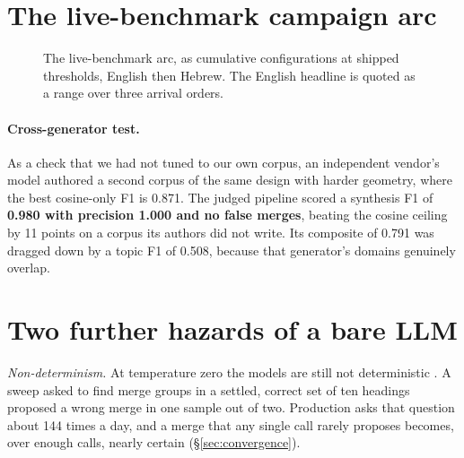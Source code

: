 \documentclass{article}
\newcommand{\hl}[1]{\textbf{#1}}
\begin{document}
\section{The live-benchmark campaign arc}
\label{app:arc}
\begin{figure}[h]
\centering
{}
\caption{The live-benchmark arc, as cumulative configurations at shipped thresholds, English then Hebrew. The English headline is quoted as a range over three arrival orders.}
\label{fig:arc}
\end{figure}
\paragraph{Cross-generator test.} As a check that we had not tuned to our own corpus, an independent vendor's model authored a second corpus of the same design with harder geometry, where the best cosine-only F1 is 0.871. The judged pipeline scored a synthesis F1 of \hl{0.980 with precision 1.000 and no false merges}, beating the cosine ceiling by 11 points on a corpus its authors did not write. Its composite of 0.791 was dragged down by a topic F1 of 0.508, because that generator's domains genuinely overlap.


\section{Two further hazards of a bare LLM}
\label{app:llmhazards}
\emph{Non-determinism.} At temperature zero the models are still not deterministic \citep{atil2024llm}. A sweep asked to find merge groups in a settled, correct set of ten headings proposed a wrong merge in one sample out of two. Production asks that question about 144 times a day, and a merge that any single call rarely proposes becomes, over enough calls, nearly certain (\S\ref{sec:convergence}).
\end{document}
